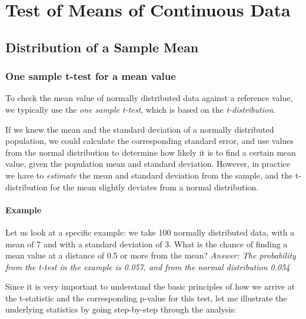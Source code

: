 \chapter{Test of Means of Continuous Data}

\section{Distribution of a Sample Mean}

\subsection{One sample t-test for a mean value} 

To check the mean value of normally distributed data against a reference value, we typically use the \emph{one sample t-test}, which is based on the \emph{t-distribution}.

If we knew the mean and the standard deviation of a normally distributed population, we could calculate the corresponding standard error, and use values from the normal distribution to determine how likely it is to find a certain mean value, given the population mean and standard deviation. However, in practice we have to \emph{estimate} the mean and standard deviation from the sample, and the t-distribution for the mean slightly deviates from a normal distribution.

\subsubsection{Example}

Let us look at a specific example: we take 100 normally distributed data, with a mean of 7 and with a standard deviation of 3.
What is the chance of finding a mean value at a distance of 0.5 or more from the mean? \emph{Answer: The probability from the t-test in the example is 0.057, and from the normal distribution 0.054}

Since it is very important to understand the basic principles of how we arrive at the t-statistic and the corresponding p-value for this test, let me illustrate the underlying statistics by going step-by-step through the analysis:

